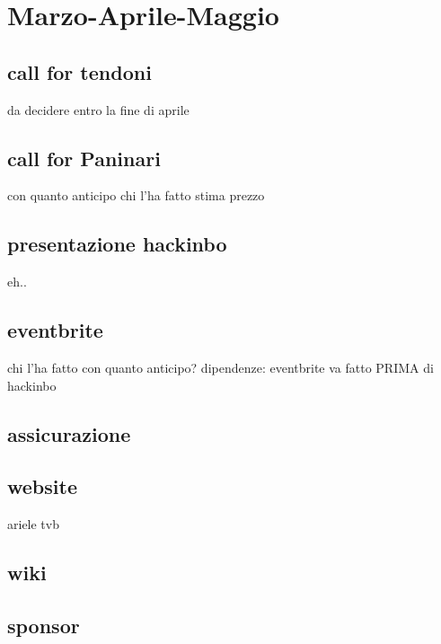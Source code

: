 \chapter{Marzo-Aprile-Maggio}

\section{call for tendoni}
da decidere entro la fine di aprile

\section{call for Paninari}
con quanto anticipo
chi l'ha fatto 
stima prezzo



\section{presentazione hackinbo}
eh..


\section{eventbrite}
chi l'ha fatto
con quanto anticipo?
dipendenze: eventbrite va fatto PRIMA di hackinbo



\section{assicurazione}

\section{website}
ariele tvb 

\section{wiki}


\section{sponsor}

